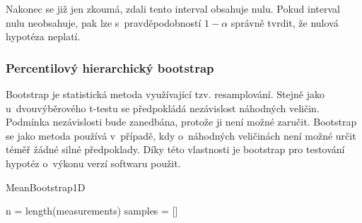 %
%
%
%
%
%
%
%

Nakonec se již jen zkoumá, zdali tento interval obsahuje nulu.
Pokud interval nulu neobsahuje, pak lze s~pravděpodobností $1-\alpha$ správně tvrdit, že
nulová hypotéza neplatí.

\subsubsection{Percentilový hierarchický bootstrap}


Bootstrap je statistická metoda využívající tzv. resamplování.
Stejně jako u~dvouvýběrového t-testu se předpokládá nezávislost náhodných veličin.
Podmínka nezávislosti bude zanedbána, protože ji není možné zaručit.
Bootstrap se jako metoda používá v~případě, kdy o~náhodných veličinách není možné
určit téměř žádné silné předpoklady. Díky této vlastnosti je bootstrap pro testování
hypotéz o~výkonu verzí softwaru použit.

\begin{algorithm}[!ht]
    \caption{MeanBootstrap1D}
    
    n = length(measurements)\;
    samples = []\;

    
    \;
\end{algorithm}

